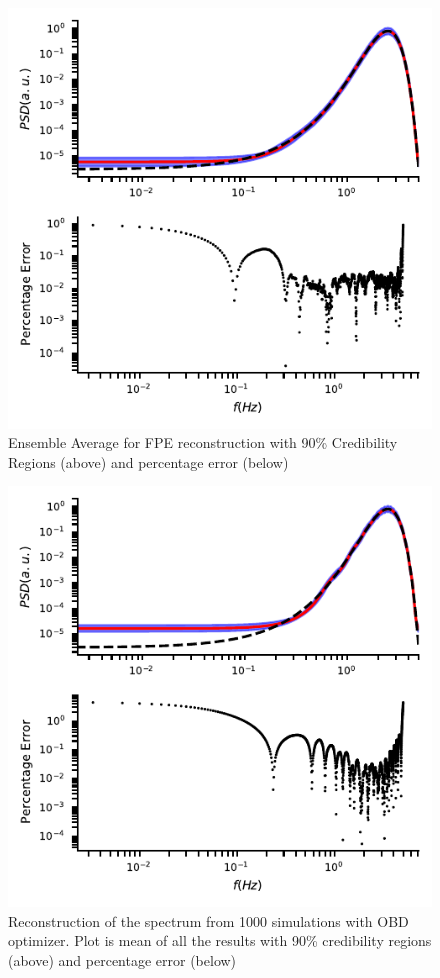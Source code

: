 \documentclass[twocolumn,showpacs,preprintnumbers,nofootinbib,prd,
superscriptaddress,10pt]{revtex4-1}
\begin{document}
\begin{figure}[t]
	\centering
	\includegraphics[width = \linewidth]{Images/optimisers_comparison/normal/FPE_spectrum_estim.pdf}
	\caption{Ensemble Average for FPE reconstruction with 90\% Credibility Regions (above) and percentage error (below)}
	\label{fig:FPEmean}
\end{figure}
\begin{figure}[t]
	\centering
	\includegraphics[width = \linewidth]{Images/optimisers_comparison/normal/OBD_spectrum_estim.pdf}
	\caption{Reconstruction of the spectrum from 1000 simulations with OBD optimizer. Plot is mean of all the results with 90\% credibility regions (above) and percentage error (below)}
	\label{fig:OBDmean}
\end{figure}
\end{document}
